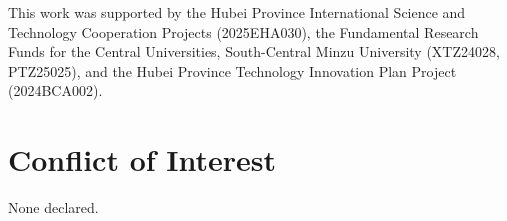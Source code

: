 \documentclass[11pt,twocolumn]{article}
\begin{document}
This work was supported by the Hubei Province International Science and Technology Cooperation Projects (2025EHA030), the Fundamental Research Funds for the Central Universities, South-Central Minzu University (XTZ24028, PTZ25025), and the Hubei Province Technology Innovation Plan Project (2024BCA002).

\section*{Conflict of Interest}

None declared.



\end{document}

